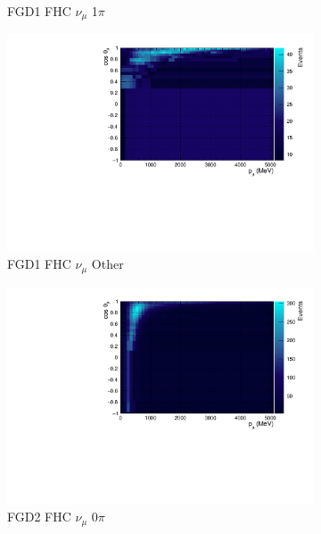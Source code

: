 \begin{figure}[!htbp]
\begin{subfigure}{.32\textwidth}
  \caption{FGD1 FHC $\nu_{\mu}$ 1$\pi$}
  \label{fig:th2polynomFGD1_numuCC_1pi}
\end{subfigure}
\begin{subfigure}{.32\textwidth}
  \centering
  \includegraphics[width=0.95\linewidth]{figs/TH2PolyNom_MC_FGD1_numuCC_other}
  \caption{FGD1 FHC $\nu_{\mu}$ Other}
  \label{fig:th2polynomFGD1_numuCC_other}
\end{subfigure}
\centering
\begin{subfigure}{.32\textwidth}
  \centering
  \includegraphics[width=0.95\linewidth]{figs/TH2PolyNom_MC_FGD2_numuCC_0pi}
  \caption{FGD2 FHC $\nu_{\mu}$ 0$\pi$}
  \label{fig:th2polynomFGD2_numuCC_0pi}
\end{subfigure}
\begin{subfigure}{.32\textwidth}
  \centering

\end{subfigure}
\end{figure}
